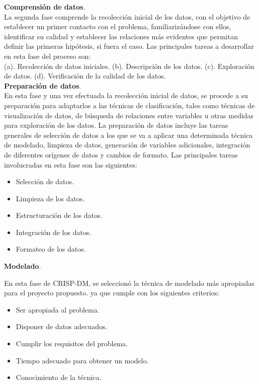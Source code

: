 \noindent
\textbf{Comprensión de datos}.\\

	La segunda fase comprende la recolección inicial de los  datos, con el objetivo de establecer un primer contacto con el problema, familiarizándose con ellos, identificar su calidad y establecer las relaciones más evidentes que permitan definir las primeras hipótesis, si fuera el caso. Las principales tareas a desarrollar en esta fase del proceso son:\\

(a).	Recolección de datos iniciales. 
(b).	Descripción de los datos.
(c).	Exploración de datos.
(d).	Verificación de la calidad de los datos.\\

\noindent
\textbf{Preparación de datos}.\\

En esta fase y una vez efectuada la recolección inicial de datos, se procede a su preparación para adaptarlos a las técnicas de clasificación, tales como técnicas de visualización de datos, de búsqueda de relaciones entre variables u otras medidas para exploración de los datos. La preparación de datos incluye las tareas generales de selección de datos a los que se va a aplicar una determinada técnica de modelado, limpieza de datos, generación de variables adicionales, integración de diferentes orígenes de datos y cambios de formato. Las principales tareas involucradas en esta fase son las siguientes:\\

\begin{itemize}
\item	Selección de datos.
\item Limpieza de los datos.
\item	Estructuración de los datos.
\item	Integración de los datos.
\item	Formateo de los datos.\\
\end{itemize}

\noindent
\textbf{Modelado}.

En esta fase de CRISP-DM, se seleccionó la técnica de modelado más apropiadas para el proyecto propuesto. ya que cumple con los siguientes criterios: 

\begin{itemize}
\item	Ser apropiada al problema. 
\item	Disponer de datos adecuados. 
\item	Cumplir los requisitos del problema. 
\item	Tiempo adecuado para obtener un modelo. 
\item	Conocimiento de la técnica.
\end{itemize}

